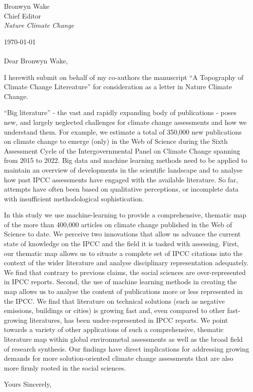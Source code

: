 \documentclass{letter}
\begin{document}
\begin{letter}{Bronwyn Wake \\ Chief Editor \\ \textit{Nature Climate Change}}
		\date{}
		
		


   \opening{\today \\ \\ Dear Bronwyn Wake,}

   I herewith submit on behalf of my co-authors the manuscript ``A Topography of Climate Change Litereature'' for consideration as a letter in Nature Climate Change.

``Big literature'' - the vast and rapidly expanding body of publications - poses new, and largely neglected challenges for climate change assessments and how we understand them. For example, we estimate a total of 350,000 new publications on climate change to emerge (only) in the Web of Science during the Sixth Assessment Cycle of the Intergovernmental Panel on Climate Change spanning from 2015 to 2022. Big data and machine learning methods need to be applied to maintain an overview of developments in the scientific landscape and to analyse how past IPCC assessments have engaged with the available literature. So far, attempts \cite{Bjurström2011, Hulme2010, Victor2015, Kowarsch2017} have often been based on qualitative perceptions, or incomplete data with insufficient methodological sophistication.

In this study we use machine-learning to provide a comprehensive, thematic map of the more than 400,000 articles on climate change published in the Web of Science to date. We perceive two innovations that allow us advance the current state of knowledge on the IPCC and the field it is tasked with assessing. First, our thematic map allows us to situate a complete set of IPCC citations into the context of the wider literature and analyse disciplinary representation adequately.  We find that contrary to previous claims, the social sciences are over-represented in IPCC reports.
Second, the use of machine learning methods in creating the map allows us to analyse the content of publications more or less represented in the IPCC. We find that literature on technical solutions (such as negative emissions, buildings or cities) is growing fast and, even compared to other fast-growing literatures, has been under-represented in IPCC reports. We point towards a variety of other applications of such a comprehensive, thematic literature map within global environmetal assessments as well as the broad field of research synthesis. Our findings have direct implications for addressing growing demands for more solution-oriented climate change assessments that are also more firmly rooted in the social sciences.

\closing{Yours Sincerely,}





\end{letter}
\end{document}

